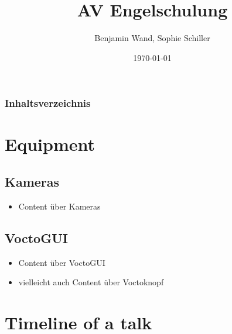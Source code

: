 \documentclass[hyperref={pdfpagelabels=false}]{beamer}
\title{AV Engelschulung}    %
\author{Benjamin Wand, Sophie Schiller}  %
\date{\today}
\begin{document}
\begin{frame}
\titlepage
\end{frame} 

\begin{frame}
\frametitle{Inhaltsverzeichnis}   %
\tableofcontents
\end{frame} 


\section{Equipment} 
\subsection{Kameras}
\begin{frame}
\begin{itemize}
\item Content über Kameras
\end{itemize}
\end{frame}

\subsection{VoctoGUI}
\begin{frame} 
\begin{itemize}
\item Content über VoctoGUI 
\item vielleicht auch Content über Voctoknopf
\end{itemize}
\end{frame}


\section{Timeline of a talk} 
\end{document}
